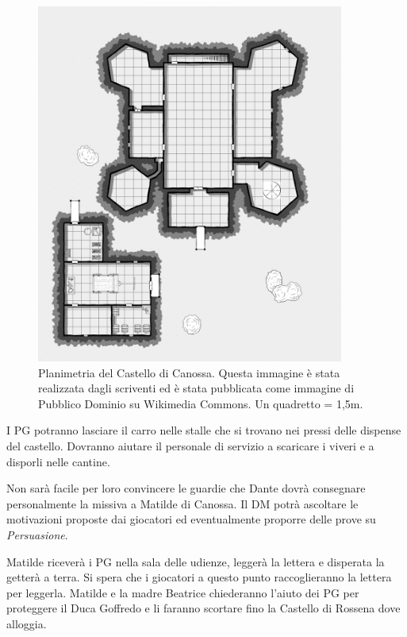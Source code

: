 \documentclass[letterpaper,twocolumn,openany,nodeprecatedcode]{dndbook}
\begin{document}
\begin{figure}
\centering
\includegraphics[width=0.9\textwidth]{img/canossa.png}
\caption{Planimetria del Castello di Canossa. Questa immagine è stata realizzata dagli scriventi ed è stata pubblicata come immagine di Pubblico Dominio su Wikimedia Commons. Un quadretto = 1,5m.}
\label{cansossa-map}
\end{figure}

I PG potranno lasciare il carro nelle stalle che si trovano nei pressi delle dispense del castello. Dovranno aiutare il personale di servizio a scaricare i viveri e a disporli nelle cantine.

Non sarà facile per loro convincere le guardie che Dante dovrà consegnare personalmente la missiva a Matilde di Canossa. Il DM potrà ascoltare le motivazioni proposte dai giocatori ed eventualmente proporre delle prove su \textit{Persuasione}.

Matilde riceverà i PG nella sala delle udienze, leggerà la lettera e disperata la getterà a terra. Si spera che i giocatori a questo punto raccoglieranno la lettera per leggerla. Matilde e la madre Beatrice chiederanno l'aiuto dei PG per proteggere il Duca Goffredo e li faranno scortare fino la Castello di Rossena dove alloggia.
\end{document}
